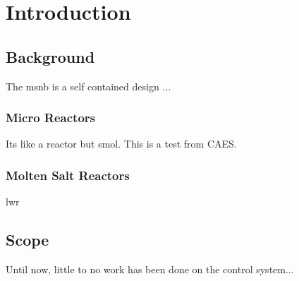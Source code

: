 \chapter{Introduction}
\label{Chapter:Introduction}

\section{Background}
The \acf{msnb} is a self contained design \cite{CarterPHD,PetersonMS}... 

\subsection{Micro Reactors}
Its like a reactor but smol. This is a test from CAES.

\subsection{Molten Salt Reactors}
\acf{lwr}


\section{Scope}
Until now, little to no work has been done on the control system... 
